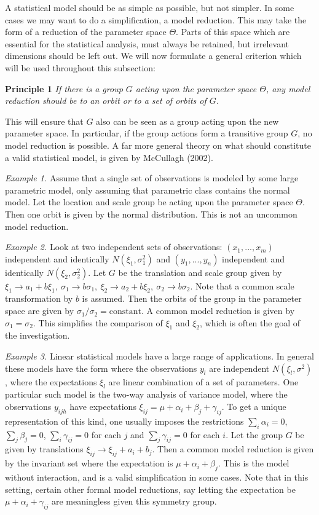 \documentclass[11pt]{article}
\begin{document}
A statistical model should be as simple as possible, but not simpler. In some cases we may want to do a simplification, a model reduction. This may take the form of a reduction of the parameter space $\Theta$. Parts of this space which 
are essential for the statistical analysis, must always be retained, but irrelevant dimensions should be left out. We will now formulate a general criterion which will be used throughout this subsection:
\bigskip

\textbf{Principle 1} \textit{If there is a group $G$ acting upon the parameter space $\Theta$, any model reduction should be to an orbit or to a set of orbits of $G$.}
\bigskip

This will ensure that $G$ also can be seen as a group acting upon the new parameter space. In particular, if the group actions form a transitive group $G$, no model reduction is possible. A far more general theory on what should constitute a valid statistical model, is given by McCullagh (2002).
\bigskip

\textit{Example 1.} Assume that a single set of observations is modeled by some large parametric model, only assuming that parametric class contains the 
normal model. Let the location and scale group be acting upon the parameter space $\Theta$. Then one orbit is given by the normal distribution. 
This is not an uncommon model reduction.
\bigskip

\textit{Example 2.} Look at two independent sets of observations: $(x_1 ,...,x_m )$ independent and identically $N(\xi_1,\sigma_1^2)$ and 
$(y_1 ,...,y_n )$ independent and identically $N(\xi_2 , \sigma_2 ^2)$. Let $G$ be the translation and scale group given by 
$\xi_1 \rightarrow a_1 +b\xi_1 ,\ \sigma_1 \rightarrow b\sigma_1 , \ \xi_2 \rightarrow a_2 +b\xi_2 ,\ \sigma_2 \rightarrow b\sigma_2 $. 
Note that a common scale transformation by $b$ is assumed. Then the orbits of the group in the parameter space are given by 
$\sigma_1 /\sigma_2 =\mathrm{constant}$. A common model reduction is given by $\sigma_1 =\sigma_2 $. This simplifies the 
comparison of $\xi_1 $ and $\xi_2 $, which is often the goal of the investigation.
\bigskip

\textit{Example 3.} Linear statistical models have a large range of applications. In general these models have the form where the observations $y_l$ are 
independent $N(\xi_l ,\sigma^2 )$, where the expectations $\xi_l$ are linear combination of a set of parameters. One particular such model is the two-way 
analysis of variance model, where the observations $y_{ijh}$ have expectations $\xi_{ij}=\mu +\alpha_i +\beta_j +\gamma_{ij}$. To get a unique representation of this 
kind, one usually imposes the restrictions $\sum_i \alpha_i =0$, $\sum_j \beta_j =0$, $\sum_i \gamma_{ij} =0$ for each $j$ and $\sum_j \gamma_{ij} =0$ 
for each $i$. Let the group $G$ be given by translations $\xi_{ij}\rightarrow\xi_{ij}+a_i+b_j$. Then a common model reduction is given 
by the invariant set where the expectation is $\mu +\alpha_i +\beta_j $. This is the model without interaction, and is a valid simplification in some cases. Note that in this setting, certain other formal model reductions, say letting the expectation be $\mu+\alpha_i +\gamma_{ij}$ are meaningless given this symmetry group.
\bigskip
\end{document}
